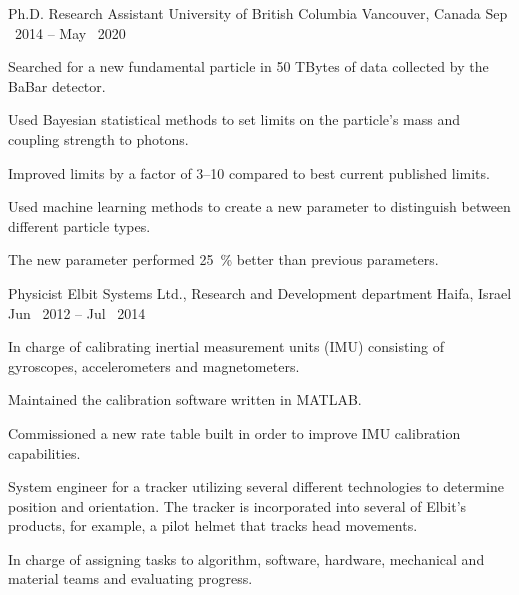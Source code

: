 

\begin{cventries}

    \cventryWithTags
    {Ph.D. Research Assistant} %
    {University of British Columbia} %
    {Vancouver, Canada} %
    {Sep \ 2014 -- May \ 2020} %
    {         \fbox{\LaTeX}} %
    {
      \begin{cvitems} %
        \item {Searched for a new fundamental particle in 50 TBytes of data collected by the BaBar detector.}
        \item {Used Bayesian statistical methods to set limits on the particle's mass and coupling strength to photons.}
        \item {Improved limits by a factor of 3--10 compared to best current published limits.}
        \item {Used machine learning methods to create a new parameter to distinguish between different particle types.}
        \item {The new parameter performed \SI{25}{\percent} better than previous parameters.}
      \end{cvitems}
    }

    \cventryWithTags
    {Physicist} %
    {Elbit Systems Ltd., Research and Development department} %
    {Haifa, Israel} %
    {Jun \ 2012 -- Jul \ 2014} %
    {  }
    {
      \begin{cvitems} %
        \item {In charge of calibrating inertial measurement units (IMU) consisting of gyroscopes, accelerometers and magnetometers.}
        \item {Maintained the calibration software written in MATLAB.}
        \item {Commissioned a new rate table built in order to improve IMU calibration capabilities.}
        \item {System engineer for a tracker utilizing several different
          technologies to determine position and orientation. The tracker is incorporated into several of Elbit's products, for example, a pilot helmet that tracks head movements.}
        \item {In charge of assigning tasks to algorithm, software, hardware, mechanical and material teams and evaluating progress.}
      \end{cvitems}
    }


\end{cventries}
